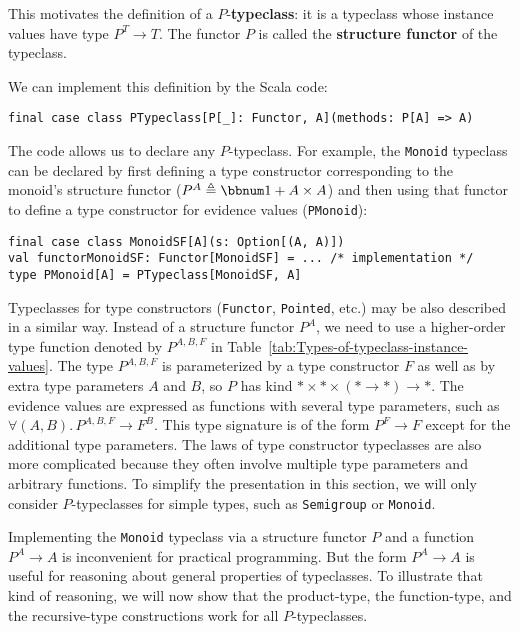 This motivates the definition of  a $P$-\textbf{typeclass}:
it is a typeclass whose instance values have type $P^{T}\rightarrow T$.
The functor $P$ is called the \textbf{structure
functor} of the typeclass.

We can implement this definition by the Scala code:
\begin{lstlisting}
final case class PTypeclass[P[_]: Functor, A](methods: P[A] => A)
\end{lstlisting}
The code allows us to declare any $P$-typeclass. For example, the
\lstinline!Monoid! typeclass can be declared by first defining a
type constructor corresponding to the monoid\textsf{'}s structure functor ($P^{A}\triangleq\bbnum 1+A\times A$)
and then using that functor to define a type constructor for evidence
values (\lstinline!PMonoid!):
\begin{lstlisting}
final case class MonoidSF[A](s: Option[(A, A)])
val functorMonoidSF: Functor[MonoidSF] = ... /* implementation */
type PMonoid[A] = PTypeclass[MonoidSF, A]
\end{lstlisting}

Typeclasses for type constructors (\lstinline!Functor!, \lstinline!Pointed!,
etc.) may be also described in a similar way. Instead of a structure
functor $P^{A}$, we need to use a higher-order type function denoted
by $P^{A,B,F}$ in Table~\ref{tab:Types-of-typeclass-instance-values}.
The type $P^{A,B,F}$ is parameterized by a type constructor $F$
as well as by extra type parameters $A$ and $B$, so $P$ has kind
$*\times*\times(*\rightarrow*)\rightarrow*$. The evidence values
are expressed as functions with several type parameters, such as $\forall(A,B).\,P^{A,B,F}\rightarrow F^{B}$.
This type signature is of the form $P^{F}\rightarrow F$ except for
the additional type parameters. The laws of type constructor typeclasses
are also more complicated because they often involve multiple type
parameters and arbitrary functions. To simplify the presentation in
this section, we will only consider $P$-typeclasses for simple types,
such as \lstinline!Semigroup! or \lstinline!Monoid!.

Implementing the \lstinline!Monoid! typeclass via a structure functor
$P$ and a function $P^{A}\rightarrow A$ is inconvenient for practical
programming. But the form $P^{A}\rightarrow A$ is useful for reasoning
about general properties of typeclasses. To illustrate that kind of
reasoning, we will now show that the product-type, the function-type,
and the recursive-type constructions work for all $P$-typeclasses. 


